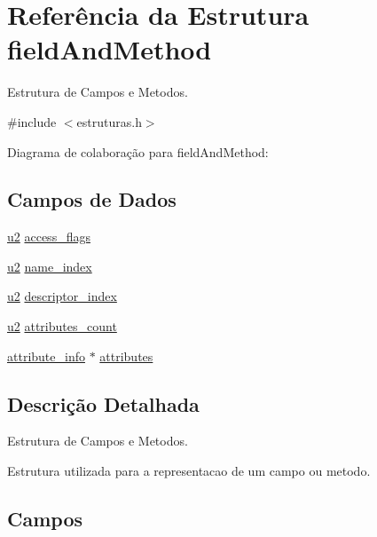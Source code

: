\hypertarget{structfield_and_method}{}\section{Referência da Estrutura field\+And\+Method}
\label{structfield_and_method}


Estrutura de Campos e Metodos.  




{\ttfamily \#include $<$estruturas.\+h$>$}



Diagrama de colaboração para field\+And\+Method\+:
\subsection*{Campos de Dados}
\begin{DoxyCompactItemize}
\item 
\hyperlink{estruturas_8h_a5f223212eef04d10a4550ded680cb1cf}{u2} \hyperlink{structfield_and_method_a04b1604b7553b064887cc578d441d7aa}{access\+\_\+flags}
\item 
\hyperlink{estruturas_8h_a5f223212eef04d10a4550ded680cb1cf}{u2} \hyperlink{structfield_and_method_ac636d7076db5a2ce9891613be8ad9b00}{name\+\_\+index}
\item 
\hyperlink{estruturas_8h_a5f223212eef04d10a4550ded680cb1cf}{u2} \hyperlink{structfield_and_method_a61c33b04e96966edbfd142eea9992834}{descriptor\+\_\+index}
\item 
\hyperlink{estruturas_8h_a5f223212eef04d10a4550ded680cb1cf}{u2} \hyperlink{structfield_and_method_a0b45411cd7a3167fdcfad1af18a799e5}{attributes\+\_\+count}
\item 
\hyperlink{estruturas_8h_a4c2796d61bb99bf730b1807fc838c847}{attribute\+\_\+info} $\ast$ \hyperlink{structfield_and_method_ad7062d512c3653c46dfa1fb6acf07396}{attributes}
\end{DoxyCompactItemize}


\subsection{Descrição Detalhada}
Estrutura de Campos e Metodos. 

Estrutura utilizada para a representacao de um campo ou metodo. 

\subsection{Campos}
